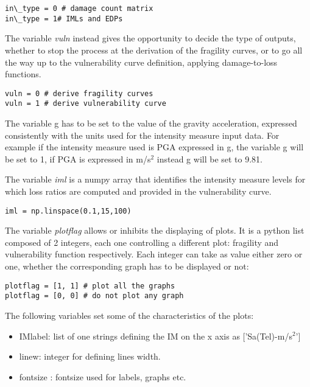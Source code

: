 \begin{Verbatim}[frame=single, commandchars=\\\{\}, samepage=true]
in\_type = 0 # damage count matrix 
in\_type = 1# IMLs and EDPs 
\end{Verbatim}

The variable \textit{vuln} instead gives the opportunity to decide the type of outputs, whether to stop the process at the derivation of the fragility curves, or to go all the way up to the vulnerability curve definition, applying damage-to-loss functions.

\begin{Verbatim}[frame=single, commandchars=\\\{\}, samepage=true]
vuln = 0 # derive fragility curves 
vuln = 1 # derive vulnerability curve
\end{Verbatim}

The variable g has to be set to the value of the gravity acceleration, expressed consistently with the units used for the intensity measure input data. For example if the intensity measure used is PGA expressed in g, the variable g will be set to 1, if PGA is expressed in m/s$^2$ instead g will be set to 9.81.

The variable \textit{iml} is a numpy array that identifies the intensity measure levels for which loss ratios are computed and provided in the vulnerability curve.

\begin{Verbatim}[frame=single, commandchars=\\\{\}, samepage=true]
iml = np.linspace(0.1,15,100)
\end{Verbatim}

The variable \textit{plotflag} allows or inhibits the displaying of plots. It is a python list composed of 2 integers, each one controlling a different plot: fragility and vulnerability function respectively. Each integer can take as value either zero or one, whether the corresponding graph has to be displayed or not:

\begin{Verbatim}[frame=single, commandchars=\\\{\}, samepage=true]
plotflag = [1, 1] # plot all the graphs
plotflag = [0, 0] # do not plot any graph
\end{Verbatim}

The following variables set some of the characteristics of the plots:
\begin{itemize}
\item IMlabel: list of one strings defining the IM on the x axis as ['Sa(Tel)-m/s$^{2}$']
\item linew: integer for defining lines width.
\item fontsize : fontsize used for labels, graphs etc.
\end{itemize}

